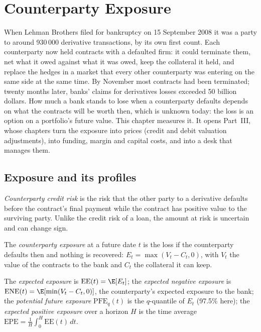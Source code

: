 \chapter{Counterparty Exposure}\label{ch:rc:counterparty-exposure}

When Lehman Brothers filed for bankruptcy on 15 September 2008 it was a party to around
930\,000 derivative transactions, by its own first count. Each counterparty now held
contracts with a defaulted firm: it could terminate them, net what it owed against what
it was owed, keep the collateral it held, and replace the hedges in a market that every
other counterparty was entering on the same side at the same time. By November most
contracts had been terminated; twenty months later, banks' claims for derivatives losses
exceeded 50 billion dollars. How much a bank stands to lose when a counterparty defaults
depends on what the contracts will be worth then, which is unknown today: the loss is an
option on a portfolio's future value. This chapter measures it. It opens Part~III, whose
chapters turn the exposure into prices (credit and debit valuation adjustments), into
funding, margin and capital costs, and into a desk that manages them.

\section{Exposure and its profiles}

\begin{definition}\label{def:rc:counterparty-exposure:ccr}
\emph{Counterparty credit risk} is the risk that the other
party to a derivative defaults before the contract's final payment while the contract has
positive value to the surviving party. Unlike the credit risk of a loan, the amount at risk
is uncertain and can change sign.
\end{definition}

\begin{definition}\label{def:rc:counterparty-exposure:exposure}
The \emph{counterparty exposure} at a future date $t$ is the
loss if the counterparty defaults then and nothing is recovered: $E_t = \max(V_t-C_t,0)$,
with $V_t$ the value of the contracts to the bank and $C_t$ the collateral it can keep.
\end{definition}

\begin{definition}\label{def:rc:counterparty-exposure:profiles}
The \emph{expected exposure} is $\mathrm{EE}(t) = \E[E_t]$; the
\emph{expected negative exposure} is
$\mathrm{ENE}(t) = \E[\min(V_t-C_t,0)]$, the counterparty's expected exposure to the bank; the
\emph{potential future exposure} $\mathrm{PFE}_q(t)$ is the
$q$-quantile of $E_t$ (97.5\% here); the \emph{expected positive
exposure} over a horizon $H$ is the time average
$\mathrm{EPE} = \frac1H\int_0^H\mathrm{EE}(t)\,dt$.
\end{definition}

